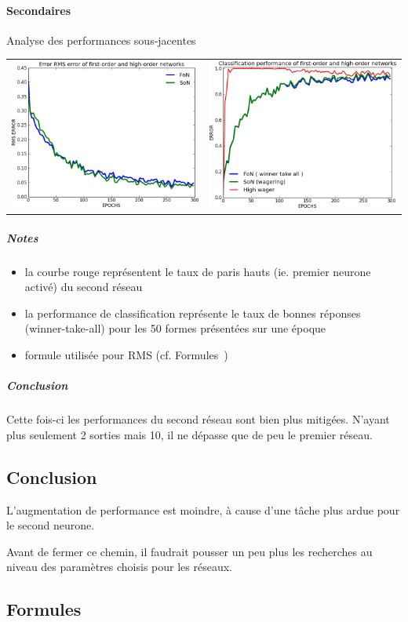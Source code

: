     \paragraph{Secondaires}
      Analyse des performances sous-jacentes
      \begin{center}
	\begin{tabular}{lr}
	  \hspace*{-1cm}
	  \includegraphics[width=250px]{data/expD2/rms.png}
	  &
	  \includegraphics[width=250px]{data/expD2/perf.png} 
	\end{tabular}
      \end{center} 
      \subparagraph{Notes}
	\begin{itemize}
	  \item la courbe rouge représentent le taux de paris hauts (ie. premier neurone activé) du second réseau
	  \item la performance de classification représente le taux de bonnes réponses (winner-take-all) pour les 50 formes présentées sur une époque
	  \item formule utilisée pour RMS (cf. Formules~)
	\end{itemize}
      \subparagraph{Conclusion}
	Cette fois-ci les performances du second réseau sont bien plus mitigées. N'ayant plus seulement 2 sorties mais 10, 
	il ne dépasse que de peu le premier réseau.


  \subsection{Conclusion}
  L'augmentation de performance est moindre, à cause d'une tâche plus ardue pour le second neurone.
  
  
  Avant de fermer ce chemin, il faudrait pousser un peu plus les recherches au niveau des paramètres choisis pour les réseaux.
  

  \newpage 
  \subsection{Formules}
    
    
    
    


